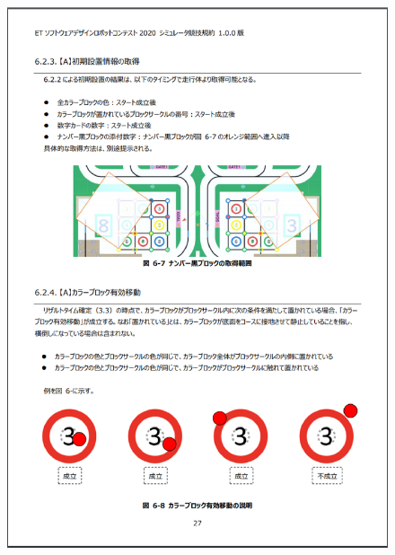 \documentclass[uplatex, report, a4j, 10pt]{jsbook}
\begin{document}
\begin{figure}[tp]
    \begin{center}
    \includegraphics[width=\hsize]{specification/ET_14.eps}
    \end{center}
\end{figure}
\end{document}
